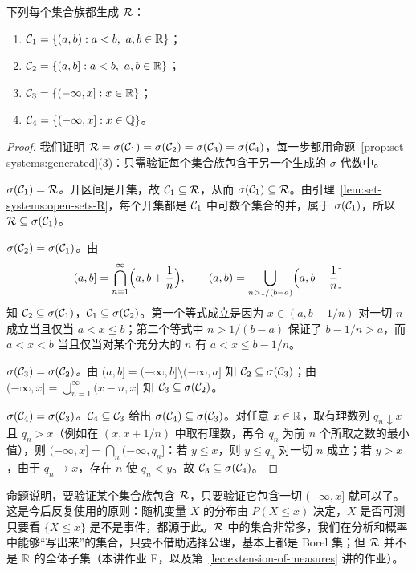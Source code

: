 \begin{proposition}\label{prop:set-systems:borel-generators}
下列每个集合族都生成 $\mathcal{R}$：
\begin{enumerate}
\item $\cC_1=\{(a,b): a<b,\ a,b\in\R\}$；
\item $\cC_2=\{(a,b]: a<b,\ a,b\in\R\}$；
\item $\mathcal{C}_3=\{(-\infty,x]: x\in\mathbb{R}\}$；
\item $\mathcal{C}_4=\{(-\infty,x]: x\in\mathbb{Q}\}$。
\end{enumerate}
\end{proposition}
\begin{proof}
我们证明 $\mathcal{R}=\sigma(\mathcal{C}_1)=\sigma(\mathcal{C}_2)=\sigma(\mathcal{C}_3)=\sigma(\mathcal{C}_4)$，每一步都用命题~\ref{prop:set-systems:generated}(3)：只需验证每个集合族包含于另一个生成的 $\sigma$-代数中。

\emph{$\sigma(\mathcal{C}_1)=\mathcal{R}$。}开区间是开集，故 $\mathcal{C}_1\subseteq\mathcal{R}$，从而 $\sigma(\mathcal{C}_1)\subseteq\mathcal{R}$。由引理~\ref{lem:set-systems:open-sets-R}，每个开集都是 $\mathcal{C}_1$ 中可数个集合的并，属于 $\sigma(\mathcal{C}_1)$，所以 $\mathcal{R}\subseteq\sigma(\mathcal{C}_1)$。

\emph{$\sigma(\mathcal{C}_2)=\sigma(\mathcal{C}_1)$。}由
\[
(a,b]=\bigcap_{n=1}^\infty\Bigl(a,b+\frac1n\Bigr),\qquad (a,b)=\bigcup_{n>1/(b-a)}\Bigl(a,b-\frac1n\Bigr]
\]
知 $\mathcal{C}_2\subseteq\sigma(\mathcal{C}_1)$，$\mathcal{C}_1\subseteq\sigma(\mathcal{C}_2)$。第一个等式成立是因为 $x\in(a,b+1/n)$ 对一切 $n$ 成立当且仅当 $a<x\leqslant b$；第二个等式中 $n>1/(b-a)$ 保证了 $b-1/n>a$，而 $a<x<b$ 当且仅当对某个充分大的 $n$ 有 $a<x\leqslant b-1/n$。

\emph{$\sigma(\mathcal{C}_3)=\sigma(\mathcal{C}_2)$。}由 $(a,b]=(-\infty,b]\setminus(-\infty,a]$ 知 $\mathcal{C}_2\subseteq\sigma(\mathcal{C}_3)$；由 $(-\infty,x]=\bigcup_{n=1}^\infty(x-n,x]$ 知 $\mathcal{C}_3\subseteq\sigma(\mathcal{C}_2)$。

\emph{$\sigma(\mathcal{C}_4)=\sigma(\mathcal{C}_3)$。}$\mathcal{C}_4\subseteq\mathcal{C}_3$ 给出 $\sigma(\mathcal{C}_4)\subseteq\sigma(\mathcal{C}_3)$。对任意 $x\in\mathbb{R}$，取有理数列 $q_n\downarrow x$ 且 $q_n>x$（例如在 $(x,x+1/n)$ 中取有理数，再令 $q_n$ 为前 $n$ 个所取之数的最小值），则 $(-\infty,x]=\bigcap_n(-\infty,q_n]$：若 $y\leqslant x$，则 $y\leqslant q_n$ 对一切 $n$ 成立；若 $y>x$，由于 $q_n\to x$，存在 $n$ 使 $q_n<y$。故 $\mathcal{C}_3\subseteq\sigma(\mathcal{C}_4)$。
\end{proof}

\begin{remark}
命题说明，要验证某个集合族包含 $\mathcal{R}$，只要验证它包含一切 $(-\infty,x]$ 就可以了。这是今后反复使用的原则：随机变量 $X$ 的分布由 $P(X\leqslant x)$ 决定，$X$ 是否可测只要看 $\{X\leqslant x\}$ 是不是事件，都源于此。$\mathcal{R}$ 中的集合非常多，我们在分析和概率中能够“写出来”的集合，只要不借助选择公理，基本上都是 Borel 集；但 $\mathcal{R}$ 并不是 $\mathbb{R}$ 的全体子集（本讲作业 F，以及第~\ref{lec:extension-of-measures} 讲的作业）。
\end{remark}

